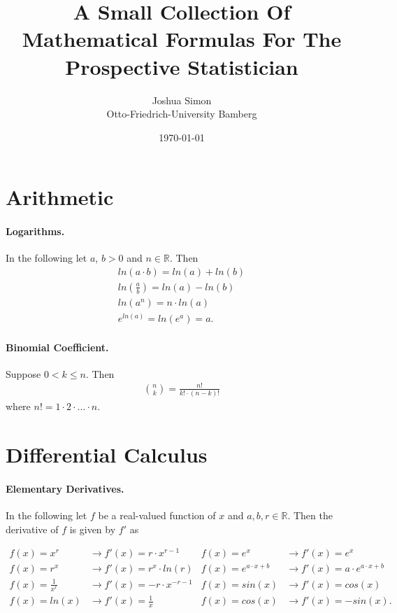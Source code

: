 \documentclass{article}
\title{A Small Collection Of Mathematical Formulas For The 
Prospective Statistician}
\author{Joshua Simon  \\
	Otto-Friedrich-University Bamberg \\
	}
\date{\today}
\begin{document}
\maketitle



\section{Arithmetic}
\paragraph{Logarithms.} In the following let $a$, $b > 0$ and $n \in \mathbb{R}$. Then
\begin{gather*}
    ln(a \cdot b) = ln(a) + ln(b) \\
    ln(\frac{a}{b}) = ln(a) - ln(b) \\
    ln(a^n) = n \cdot ln(a) \\
    e^{ln(a)} = ln(e^{a}) = a.
\end{gather*}

\paragraph{Binomial Coefficient.} Suppose $0 < k \leq n$. Then
\begin{gather*}
    \binom{n}{k} = \frac{n!}{k! \cdot (n-k)!}
\end{gather*}
where $n! = 1 \cdot 2 \cdot \ldots \cdot n$.



\section{Differential Calculus} \label{DifferentialCalculus}
\paragraph{Elementary Derivatives.} In the following let $f$ be a real-valued function of $x$ and $a, b, r \in \mathbb{R}$. Then the derivative of $f$ is given by $f'$ as

\begin{align*}
    f(x) = x^r &\rightarrow f'(x) = r \cdot x^{r - 1} 
    &f(x) = e^x &\rightarrow f'(x) = e^x \\
    f(x) = r^x &\rightarrow f'(x) = r^x \cdot ln(r) 
    &f(x) = e^{a \cdot x + b} &\rightarrow f'(x) = a \cdot e^{a \cdot x + b} \\
    f(x) = \frac{1}{x^r}  &\rightarrow f'(x) = - r \cdot x^{-r - 1}
    &f(x) = sin(x) &\rightarrow f'(x) = cos(x) \\
    f(x) = ln(x) &\rightarrow f'(x) = \frac{1}{x} 
    &f(x) = cos(x) &\rightarrow f'(x) = - sin(x).
\end{align*}
\end{document}
